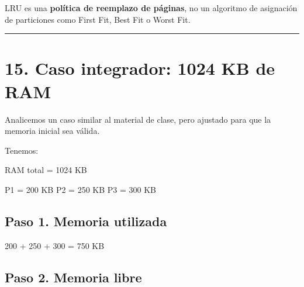 \documentclass[
  spanish,
  letterpaper,
]{scrbook}
\newenvironment{Shaded}{\begin{snugshade}}{\end{snugshade}}
\newcommand{\NormalTok}[1]{\textcolor[rgb]{0.00,0.23,0.31}{#1}}
\begin{document}
\begin{tcolorbox}[enhanced jigsaw, arc=.35mm, bottomrule=.15mm, bottomtitle=1mm, breakable, colback=white, colbacktitle=quarto-callout-note-color!10!white, colframe=quarto-callout-note-color-frame, coltitle=black, left=2mm, leftrule=.75mm, opacityback=0, opacitybacktitle=0.6, rightrule=.15mm, title=\textcolor{quarto-callout-note-color}{\faInfo}\hspace{0.5em}{Importante}, titlerule=0mm, toprule=.15mm, toptitle=1mm]

LRU es una \textbf{política de reemplazo de páginas}, no un algoritmo de
asignación de particiones como First Fit, Best Fit o Worst Fit.

\end{tcolorbox}

\begin{center}\rule{0.5\linewidth}{0.5pt}\end{center}


\chapter{15. Caso integrador: 1024 KB de
RAM}\label{caso-integrador-1024-kb-de-ram}

Analicemos un caso similar al material de clase, pero ajustado para que
la memoria inicial sea válida.

Tenemos:

\begin{Shaded}
\begin{Highlighting}[]
\NormalTok{RAM total = 1024 KB}

\NormalTok{P1 = 200 KB}
\NormalTok{P2 = 250 KB}
\NormalTok{P3 = 300 KB}
\end{Highlighting}
\end{Shaded}

\section{Paso 1. Memoria utilizada}\label{paso-1.-memoria-utilizada}

\begin{Shaded}
\begin{Highlighting}[]
\NormalTok{200 + 250 + 300 = 750 KB}
\end{Highlighting}
\end{Shaded}

\section{Paso 2. Memoria libre}\label{paso-2.-memoria-libre}
\end{document}
